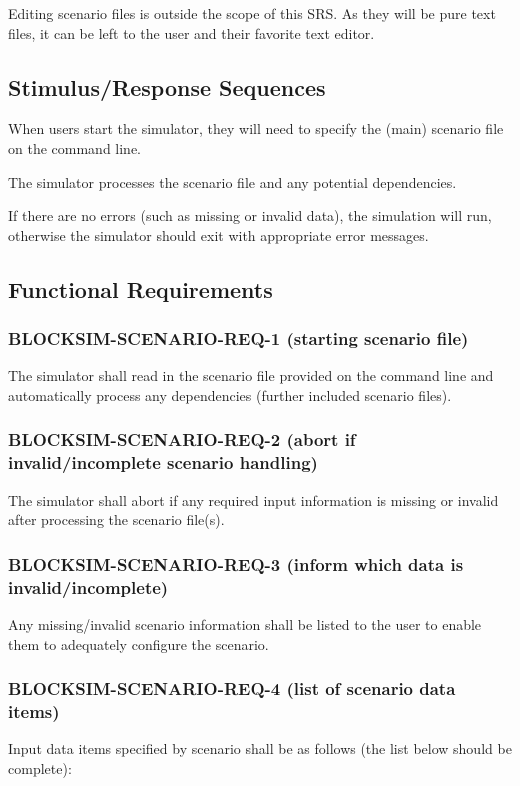 \documentclass{scrreprt}
\begin{document}
Editing scenario files is outside the scope of this SRS. As they will be pure
text files, it can be left to the user and their favorite text editor.


\subsection{Stimulus/Response Sequences}

When users start the simulator, they will need to specify the (main)
scenario file on the command line.

The simulator processes the scenario file and any potential dependencies.

If there are no errors (such as missing or invalid data), the simulation
will run, otherwise the simulator should exit with appropriate error messages.


\subsection{Functional Requirements}


\subsubsection{BLOCKSIM-SCENARIO-REQ-1 (starting scenario file)}

The simulator shall read in the scenario file provided on the command line and
automatically process any dependencies (further included scenario files).


\subsubsection{BLOCKSIM-SCENARIO-REQ-2 (abort if invalid/incomplete scenario handling)}

The simulator shall abort if any required input information is missing or
invalid after processing the scenario file(s).

\subsubsection{BLOCKSIM-SCENARIO-REQ-3 (inform which data is invalid/incomplete)}
Any missing/invalid scenario information shall be listed to the user to enable
them to adequately configure the scenario.


\subsubsection{BLOCKSIM-SCENARIO-REQ-4 (list of scenario data items)}
Input data items specified by scenario shall be as follows
(the list below should be complete):
\end{document}
